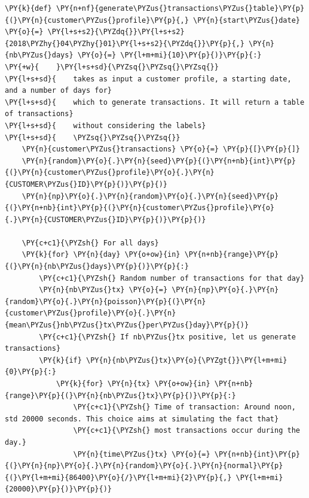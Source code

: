     \begin{tcolorbox}[breakable, size=fbox, boxrule=1pt, pad at break*=1mm,colback=cellbackground, colframe=cellborder]
\begin{Verbatim}[commandchars=\\\{\}]
\PY{k}{def} \PY{n+nf}{generate\PYZus{}transactions\PYZus{}table}\PY{p}{(}\PY{n}{customer\PYZus{}profile}\PY{p}{,} \PY{n}{start\PYZus{}date} \PY{o}{=} \PY{l+s+s2}{\PYZdq{}}\PY{l+s+s2}{2018\PYZhy{}04\PYZhy{}01}\PY{l+s+s2}{\PYZdq{}}\PY{p}{,} \PY{n}{nb\PYZus{}days} \PY{o}{=} \PY{l+m+mi}{10}\PY{p}{)}\PY{p}{:}
\PY{+w}{    }\PY{l+s+sd}{\PYZsq{}\PYZsq{}\PYZsq{}}
\PY{l+s+sd}{    takes as input a customer profile, a starting date, and a number of days for}
\PY{l+s+sd}{    which to generate transactions. It will return a table of transactions}
\PY{l+s+sd}{    without considering the labels}
\PY{l+s+sd}{    \PYZsq{}\PYZsq{}\PYZsq{}}
    \PY{n}{customer\PYZus{}transactions} \PY{o}{=} \PY{p}{[}\PY{p}{]}
    \PY{n}{random}\PY{o}{.}\PY{n}{seed}\PY{p}{(}\PY{n+nb}{int}\PY{p}{(}\PY{n}{customer\PYZus{}profile}\PY{o}{.}\PY{n}{CUSTOMER\PYZus{}ID}\PY{p}{)}\PY{p}{)}
    \PY{n}{np}\PY{o}{.}\PY{n}{random}\PY{o}{.}\PY{n}{seed}\PY{p}{(}\PY{n+nb}{int}\PY{p}{(}\PY{n}{customer\PYZus{}profile}\PY{o}{.}\PY{n}{CUSTOMER\PYZus{}ID}\PY{p}{)}\PY{p}{)}

    \PY{c+c1}{\PYZsh{} For all days}
    \PY{k}{for} \PY{n}{day} \PY{o+ow}{in} \PY{n+nb}{range}\PY{p}{(}\PY{n}{nb\PYZus{}days}\PY{p}{)}\PY{p}{:}
        \PY{c+c1}{\PYZsh{} Random number of transactions for that day}
        \PY{n}{nb\PYZus{}tx} \PY{o}{=} \PY{n}{np}\PY{o}{.}\PY{n}{random}\PY{o}{.}\PY{n}{poisson}\PY{p}{(}\PY{n}{customer\PYZus{}profile}\PY{o}{.}\PY{n}{mean\PYZus{}nb\PYZus{}tx\PYZus{}per\PYZus{}day}\PY{p}{)}
        \PY{c+c1}{\PYZsh{} If nb\PYZus{}tx positive, let us generate transactions}
        \PY{k}{if} \PY{n}{nb\PYZus{}tx}\PY{o}{\PYZgt{}}\PY{l+m+mi}{0}\PY{p}{:}
            \PY{k}{for} \PY{n}{tx} \PY{o+ow}{in} \PY{n+nb}{range}\PY{p}{(}\PY{n}{nb\PYZus{}tx}\PY{p}{)}\PY{p}{:}
                \PY{c+c1}{\PYZsh{} Time of transaction: Around noon, std 20000 seconds. This choice aims at simulating the fact that}
                \PY{c+c1}{\PYZsh{} most transactions occur during the day.}
                \PY{n}{time\PYZus{}tx} \PY{o}{=} \PY{n+nb}{int}\PY{p}{(}\PY{n}{np}\PY{o}{.}\PY{n}{random}\PY{o}{.}\PY{n}{normal}\PY{p}{(}\PY{l+m+mi}{86400}\PY{o}{/}\PY{l+m+mi}{2}\PY{p}{,} \PY{l+m+mi}{20000}\PY{p}{)}\PY{p}{)}


\end{Verbatim}
\end{tcolorbox}
